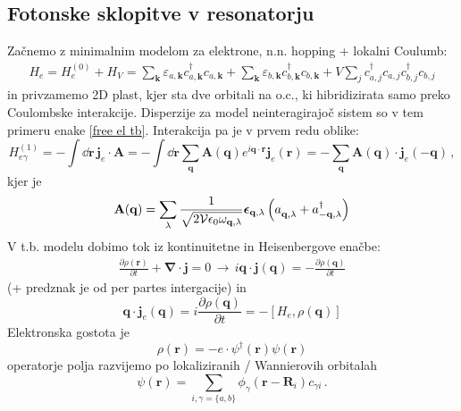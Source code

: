 \documentclass[a4paper,10pt]{article}
\renewcommand{\vec}[1]{\mathbf{#1}}
\begin{document}
\subsection{Fotonske sklopitve v resonatorju}
Začnemo z minimalnim modelom za elektrone, n.n. hopping + lokalni Coulumb: 
\begin{align}
  H_e = H_e^{(0)} + H_V = \sum_{\vec{k}} \varepsilon_{a,\vec{k}} c_{a,\vec{k}}^\dagger c_{a,\vec{k}} + \sum_{\vec{k}} \varepsilon_{b,\vec{k}} c_{b,\vec{k}}^\dagger c_{b,\vec{k}} + V \sum_j c_{a,j}^\dagger c_{a,j} c_{b,j}^\dagger c_{b,j}
\end{align}
in privzamemo 2D plast, kjer sta dve orbitali na o.c., ki hibridizirata samo preko Coulombske interakcije. Disperzije za model neinteragirajoč sistem so v tem primeru enake \eqref{free el tb}. Interakcija pa je v prvem redu oblike: 
\begin{equation}
H_{e\gamma}^{(1)} = -\int \dd{\vec{r}} \, \vec{j}_e \cdot \vec{A} = -\int \dd{\vec{r}} \sum_{\vec{q}} {\vec{A}}({\vec{q}}) e^{i\vec{q}\cdot\vec{r}} \vec{j}_e(\vec{r})  = -\sum_{\vec{q}} {\vec{A}}({\vec{q}}) \cdot \vec{j}_e(\vec{-q})\,,
\end{equation}
kjer je 
\begin{align}
  \vec{A}(\vec{q}) = \sum_\lambda \frac{1}{\sqrt{2\mathcal{V}\epsilon_0 \omega_{\vec{q}, \lambda}}} \bm{\epsilon}_{\vec{q}, \lambda} \left(a_{\vec{q}, \lambda}^{\vphantom{\dagger}} + a_{-\vec{q}, \lambda}^\dagger \right) 
\end{align}
V t.b. modelu dobimo tok iz kontinuitetne in Heisenbergove enačbe: 
\begin{align}
  \frac{\partial \rho(\vec{r})}{\partial t} + \vec{\nabla} \cdot \vec{j} = 0 \, \to\,  i\vec{q} \cdot \vec{j}(\vec{q}) = -\frac{\partial \rho(\vec{q})}{\partial t} 
\end{align}
(+ predznak je od per partes intergacije) in 
\begin{equation}
\vec{q}\cdot \vec{j}_e(\vec{q}) = i\frac{\partial \rho(\vec{q})}{\partial t} = -[H_e, \rho(\vec{q})]
\end{equation}
Elektronska gostota je
\begin{equation}
\rho(\vec{r}) = -e \cdot \psi^\dagger(\vec{r}) \psi(\vec{r})
\end{equation}
operatorje polja razvijemo po lokaliziranih / Wannierovih orbitalah
\begin{equation}
\psi(\vec{r}) = \sum_{i,\gamma=\{a, b\}} \phi_\gamma(\vec{r} - \vec{R}_i) c_{\gamma i}\,.
\end{equation}
\end{document}
